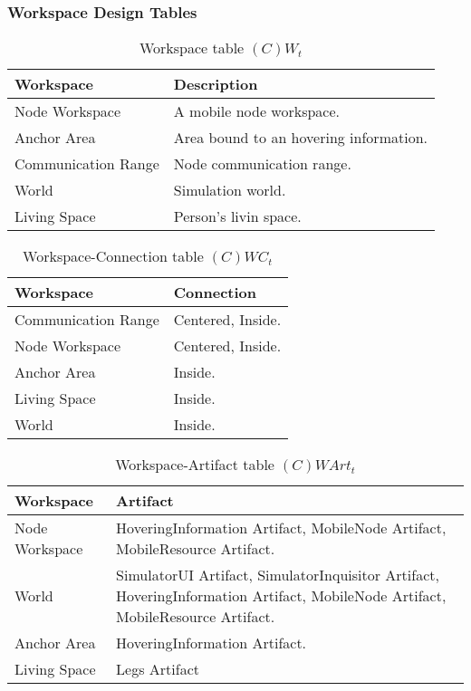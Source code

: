 \subsubsection{Workspace Design Tables}

\begin{table}[H]
	\centering
	\begin{tabular}{|p{4cm}|p{8cm}|}
			\hline
			\textbf{Workspace} & \textbf{Description} \\
			\hline
			Node Workspace  & A mobile node workspace. \\
			\hline
			Anchor Area  & Area bound to an hovering information. \\
			\hline
			Communication Range  & Node communication range. \\
			\hline
			World  & Simulation world. \\
			\hline
			Living  Space & Person's livin space.\\
			\hline
		\end{tabular}
	\caption{Workspace table $(C)W_t$}
	\label{tab:cwt}
\end{table}

\begin{table}[H]
	\centering
	\begin{tabular}{|p{4cm}|p{8cm}|}
			\hline
			\textbf{Workspace} & \textbf{Connection} \\
			\hline
			Communication Range & Centered, Inside. \\
			\hline
			Node Workspace & Centered, Inside. \\
			\hline
			Anchor Area & Inside. \\
			\hline
			Living Space & Inside. \\
			\hline
			World  & Inside. \\
			\hline
		\end{tabular}
	\caption{Workspace-Connection table $(C)WC_t$}
	\label{tab:cwct}
\end{table}

\begin{table}[H]
	\centering
	\begin{tabular}{|p{4cm}|p{8cm}|}
			\hline
			\textbf{Workspace} & \textbf{Artifact} \\
			\hline
			Node Workspace & HoveringInformation Artifact, MobileNode Artifact,
			MobileResource Artifact. \\
			\hline
			World & SimulatorUI Artifact, SimulatorInquisitor Artifact,
			HoveringInformation Artifact, MobileNode Artifact, MobileResource
			Artifact. \\
			\hline
			Anchor Area & HoveringInformation Artifact. \\
			\hline
			Living Space & Legs Artifact \\
			\hline
		\end{tabular}
	\caption{Workspace-Artifact table $(C)WArt_t$}
	\label{tab:cwartt}
\end{table}


